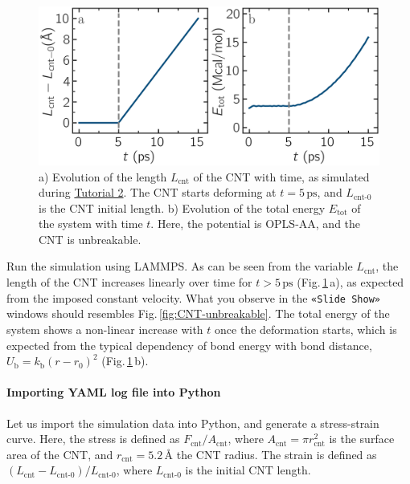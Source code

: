 \documentclass[9pt,tutorial]{livecoms}
\newcommand{\guicmd}[1]{\textcolor{command}{\texttt{«#1»}}} %
\begin{document}
\begin{figure}
\centering
\includegraphics[width=\linewidth]{CNT-unbreakable-length-energy}
\caption{a) Evolution of the length $L_\text{cnt}$ of the CNT with time,
as simulated during \hyperref[carbon-nanotube-label]{Tutorial 2}.
The CNT starts deforming at $t = 5\,\text{ps}$, and $L_\text{cnt-0}$ is the
CNT initial length.  b) Evolution of the total energy $E_\text{tot}$ of the system
with time $t$.  Here, the potential is OPLS-AA, and the CNT is unbreakable.}
\label{fig:CNT-unbreakable-LE}
\end{figure}

Run the simulation using LAMMPS.  As can be seen from the variable $L_\text{cnt}$, the length
of the CNT increases linearly over time for $t > 5\,\text{ps}$ (Fig.\,\ref{fig:CNT-unbreakable-LE}\,a),
as expected from the imposed constant velocity.  What you observe in the \guicmd{Slide Show}
windows should resembles Fig.\,\ref{fig:CNT-unbreakable}.  The total energy of the system
shows a non-linear increase with $t$ once the deformation starts, which is expected
from the typical dependency of bond energy with bond distance,
$U_\text{b} = k_\text{b} \left( r - r_0 \right)^2$ (Fig.\,\ref{fig:CNT-unbreakable-LE}\,b).

\paragraph{Importing YAML log file into Python}

Let us import the simulation data into Python, and generate a stress-strain curve.
Here, the stress is defined as $F_\text{cnt}/A_\text{cnt}$,
where $A_\text{cnt} = \pi r_\text{cnt}^2$ is the surface area of the
CNT, and $r_\text{cnt}=5.2$\,\AA{} the CNT radius.  The strain is defined
as $(L_\text{cnt}-L_\text{cnt-0})/L_\text{cnt-0}$, where $L_\text{cnt-0}$ is the initial CNT length.
\end{document}
